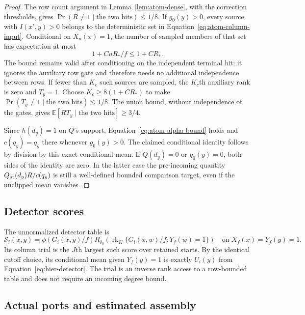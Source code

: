 \begin{proof}
The row count argument in Lemma~\ref{lem:atom-dense}, with the correction
thresholds, gives $\Pr(R\ne1\mid\text{the two hits})\le1/8$.
If $g_0(y)>0$, every source with $I(x',y)>0$ belongs to the deterministic
set in Equation~\eqref{eq:atom-column-input}.  Conditional on $X_u(x)=1$,
the number of sampled members of that set has expectation at most
\[
 1+C uR_*/f\le1+C R_*.
\]
The bound remains valid after conditioning on the independent terminal
hit; it ignores the auxiliary row gate and therefore needs no additional
independence between rows.  If fewer than $K_c$ such sources are sampled,
the $K_c$th auxiliary rank is zero and $T_y=1$.  Choose
$K_c\ge8(1+C R_*)$ to make $\Pr(T_y\ne1\mid\text{the two hits})\le1/8$.
The union bound, without independence of the gates, gives
$\mathbb E[RT_y\mid\text{the two hits}]\ge3/4$.

Since $h(d_y)=1$ on $Q$'s support, Equation~\eqref{eq:atom-alpha-bound}
holds and $c(q_y)=q_y$ there whenever $g_0(y)>0$.  The claimed conditional
identity follows by division by this exact conditional mean.  If
$Q(d_y)=0$ or $g_0(y)=0$, both sides of the identity are zero.  In the latter
case the pre-incoming quantity $Q_{\rm at}(d_y)R/c(q_y)$ is still a well-defined
bounded comparison target, even if the unclipped mean vanishes.
\end{proof}

\subsection{Detector scores}

The unnormalized detector table is
\begin{equation}
 \mathcal S_i(x,y)=\phi(G_i(x,y)/f)
 R_{\delta_0}\!\left(\operatorname{rk}_K
       \{G_i(x,w)/f:Y_f(w)=1\}\right)
 \quad\text{on }X_f(x)=Y_f(y)=1.
 \label{eq:atom-detector-table}
\end{equation}
Its column trial is the $J$th largest such score over retained starts.
By the identical cutoff choice, its conditional mean given $Y_f(y)=1$
is exactly $U_i(y)$ from Equation~\eqref{eq:hier-detector}.
The trial is an inverse rank access to a row-bounded table and does not
require an incoming degree bound.

\subsection{Actual ports and estimated assembly}

